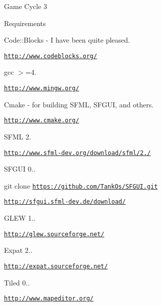 Game Cycle 3

Requirements
\begin{DoxyItemize}
\item Code\-::\-Blocks -\/ I have been quite pleased.
\begin{DoxyItemize}
\item \href{http://www.codeblocks.org/}{\tt http\-://www.\-codeblocks.\-org/}
\end{DoxyItemize}
\item gcc $>$=4.
\begin{DoxyItemize}
\item \href{http://www.mingw.org/}{\tt http\-://www.\-mingw.\-org/}
\end{DoxyItemize}
\item Cmake -\/ for building S\-F\-M\-L, S\-F\-G\-U\-I, and others.
\begin{DoxyItemize}
\item \href{http://www.cmake.org/}{\tt http\-://www.\-cmake.\-org/}
\end{DoxyItemize}
\item S\-F\-M\-L 2.
\begin{DoxyItemize}
\item \href{http://www.sfml-dev.org/download/sfml/2.1/}{\tt http\-://www.\-sfml-\/dev.\-org/download/sfml/2./}
\end{DoxyItemize}
\item S\-F\-G\-U\-I 0..
\begin{DoxyItemize}
\item git clone \href{https://github.com/TankOs/SFGUI.git}{\tt https\-://github.\-com/\-Tank\-Os/\-S\-F\-G\-U\-I.\-git}
\item \href{http://sfgui.sfml-dev.de/download/}{\tt http\-://sfgui.\-sfml-\/dev.\-de/download/}
\end{DoxyItemize}
\item G\-L\-E\-W 1..
\begin{DoxyItemize}
\item \href{http://glew.sourceforge.net/}{\tt http\-://glew.\-sourceforge.\-net/}
\end{DoxyItemize}
\item Expat 2..
\begin{DoxyItemize}
\item \href{http://expat.sourceforge.net/}{\tt http\-://expat.\-sourceforge.\-net/}
\end{DoxyItemize}
\item Tiled 0..
\begin{DoxyItemize}
\item \href{http://www.mapeditor.org/}{\tt http\-://www.\-mapeditor.\-org/}
\end{DoxyItemize}
\end{DoxyItemize}

